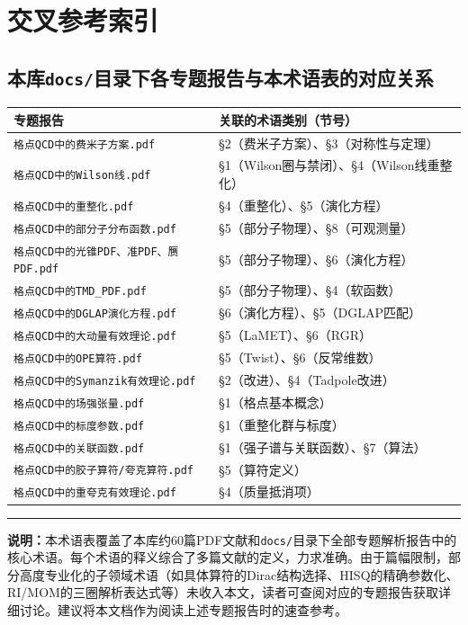 \documentclass[12pt,a4paper]{ctexart}
\begin{document}
\section{交叉参考索引}

\subsection*{本库\texttt{docs/}目录下各专题报告与本术语表的对应关系}

\begin{table}[H]
\centering
\small
\begin{tabular}{lp{10cm}}
\toprule
\textbf{专题报告} & \textbf{关联的术语类别（节号）} \\
\midrule
\texttt{格点QCD中的费米子方案.pdf} & §2（费米子方案）、§3（对称性与定理） \\
\texttt{格点QCD中的Wilson线.pdf} & §1（Wilson圈与禁闭）、§4（Wilson线重整化） \\
\texttt{格点QCD中的重整化.pdf} & §4（重整化）、§5（演化方程） \\
\texttt{格点QCD中的部分子分布函数.pdf} & §5（部分子物理）、§8（可观测量） \\
\texttt{格点QCD中的光锥PDF、准PDF、赝PDF.pdf} & §5（部分子物理）、§6（演化方程） \\
\texttt{格点QCD中的TMD\_PDF.pdf} & §5（部分子物理）、§4（软函数） \\
\texttt{格点QCD中的DGLAP演化方程.pdf} & §6（演化方程）、§5（DGLAP匹配） \\
\texttt{格点QCD中的大动量有效理论.pdf} & §5（LaMET）、§6（RGR） \\
\texttt{格点QCD中的OPE算符.pdf} & §5（Twist）、§6（反常维数） \\
\texttt{格点QCD中的Symanzik有效理论.pdf} & §2（改进）、§4（Tadpole改进） \\
\texttt{格点QCD中的场强张量.pdf} & §1（格点基本概念） \\
\texttt{格点QCD中的标度参数.pdf} & §1（重整化群与标度） \\
\texttt{格点QCD中的关联函数.pdf} & §1（强子谱与关联函数）、§7（算法） \\
\texttt{格点QCD中的胶子算符/夸克算符.pdf} & §5（算符定义） \\
\texttt{格点QCD中的重夸克有效理论.pdf} & §4（质量抵消项） \\
\bottomrule
\end{tabular}
\end{table}

\vspace{1cm}
\noindent\rule{\textwidth}{0.5pt}
\small
\textbf{说明：}本术语表覆盖了本库约60篇PDF文献和\texttt{docs/}目录下全部专题解析报告中的核心术语。每个术语的释义综合了多篇文献的定义，力求准确。由于篇幅限制，部分高度专业化的子领域术语（如具体算符的Dirac结构选择、HISQ的精确参数化、RI/MOM的三圈解析表达式等）未收入本文，读者可查阅对应的专题报告获取详细讨论。建议将本文档作为阅读上述专题报告时的速查参考。
\end{document}
